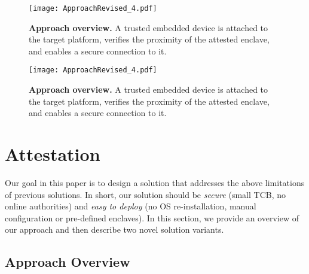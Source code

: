 

\ifusenix
\begin{figure}[t]
 \centering
  \texttt{[image: ApproachRevised\_4.pdf]}
 \caption{\textbf{Approach overview.} A trusted embedded device \device is attached to the target platform, verifies the proximity of the attested enclave, and enables a secure connection to it.}
 \vspace{-15px}
 \label{fig:approach}
\end{figure}

\else

\begin{figure}[t]
 \centering
  \texttt{[image: ApproachRevised\_4.pdf]}
 \caption{\textbf{Approach overview.} A trusted embedded device \device is attached to the target platform, verifies the proximity of the attested enclave, and enables a secure connection to it.}
 \label{fig:approach}
\end{figure}
\fi

\section{\name Attestation}
\label{sec:ourApproach}

Our goal in this paper is to design a solution that addresses the above limitations of previous solutions. In short, our solution should be \emph{secure} (small TCB, no online authorities) and \emph{easy to deploy} (no OS re-installation, manual configuration or pre-defined enclaves). In this section, we provide an overview of our approach and then describe two novel solution variants.


\subsection{Approach Overview}

